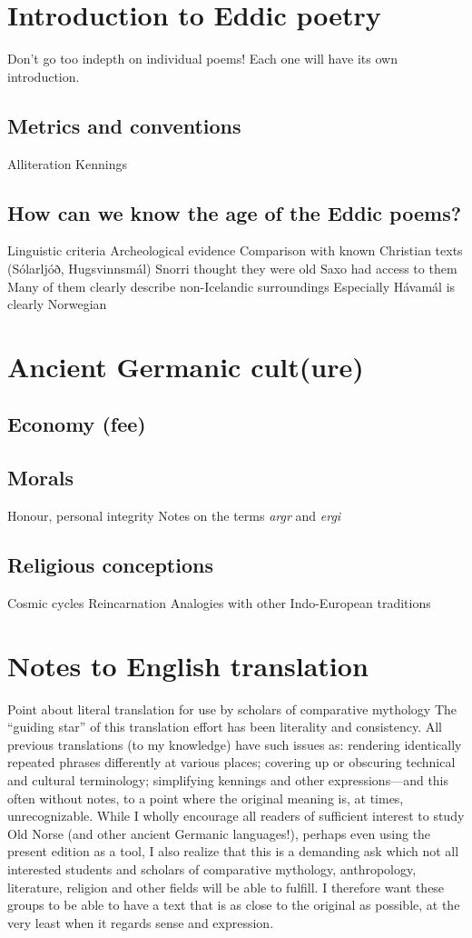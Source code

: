 \newpage


\section{Introduction to Eddic poetry}
  Don't go too indepth on individual poems! Each one will have its own introduction.
  \subsection{Metrics and conventions}
    Alliteration
    Kennings
  \subsection{How can we know the age of the Eddic poems?}
    Linguistic criteria
    Archeological evidence
    Comparison with known Christian texts (Sólarljóð, Hugsvinnsmál)
    Snorri thought they were old
    Saxo had access to them
    Many of them clearly describe non-Icelandic surroundings
      Especially Hávamál is clearly Norwegian

\section{Ancient Germanic cult(ure)}
  \subsection{Economy (fee)}
  \subsection{Morals}
    Honour, personal integrity
    Notes on the terms \emph{argr} and \emph{ergi}
  \subsection{Religious conceptions}
    Cosmic cycles
    Reincarnation
    Analogies with other Indo-European traditions

\section{Notes to English translation}
  Point about literal translation for use by scholars of comparative mythology
    The “guiding star” of this translation effort has been literality and consistency. All previous translations (to my knowledge) have such issues as: rendering identically repeated phrases differently at various places; covering up or obscuring technical and cultural terminology; simplifying kennings and other expressions—and this often without notes, to a point where the original meaning is, at times, unrecognizable.
    While I wholly encourage all readers of sufficient interest to study Old Norse (and other ancient Germanic languages!), perhaps even using the present edition as a tool, I also realize that this is a demanding ask which not all interested students and scholars of comparative mythology, anthropology, literature, religion and other fields will be able to fulfill. I therefore want these groups to be able to have a text that is as close to the original as possible, at the very least when it regards sense and expression.
